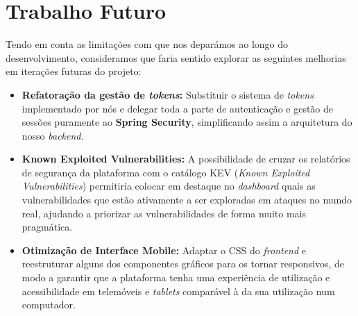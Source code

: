 \section{Trabalho Futuro}

Tendo em conta as limitações com que nos deparámos ao longo do desenvolvimento, consideramos que faria sentido explorar as seguintes melhorias em iterações futuras do projeto:

\begin{itemize}
	\item \textbf{Refatoração da gestão de \textit{tokens}:} Substituir o sistema de \textit{tokens} implementado por nós e delegar toda a parte de autenticação e gestão de sessões puramente ao \textbf{Spring Security}, simplificando assim a arquitetura do nosso \textit{backend}.
	
	\item \textbf{Known Exploited Vulnerabilities:} A possibilidade de cruzar os relatórios de segurança da plataforma com o catálogo KEV (\textit{Known Exploited Vulnerabilities}) permitiria colocar em destaque no \textit{dashboard} quais as vulnerabilidades que estão ativamente a ser exploradas em ataques no mundo real, ajudando a priorizar as vulnerabilidades de forma muito mais pragmática.
	
	\item \textbf{Otimização de Interface Mobile:} Adaptar o CSS do \textit{frontend} e reestruturar alguns dos componentes gráficos para os tornar responsivos, de modo a garantir que a plataforma tenha uma experiência de utilização e acessibilidade em telemóveis e \textit{tablets} comparável à da sua utilização num computador.
\end{itemize}